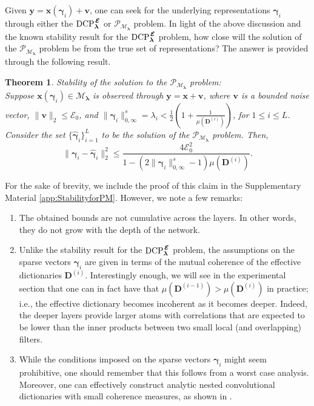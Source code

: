 \documentclass[10pt,journal]{IEEEtran}
\def\x{{\mathbf x}}
\def\v{{\mathbf v}}
\def\y{{\mathbf y}}
\def\D{{\mathbf D}}
\def\M{{\mathcal{M}}}
\def\P{{\mathcal{P}}}
\def\gama{{\boldsymbol \gamma}}
\def\lamda{{\boldsymbol \lambda}}
\def\vps{{\bm{\mathbf{\mathcal{E}}}}}
\def\DCPE{{\text{DCP}_\lamda^{\hspace{0.04cm} \vps}}}
\def\PM{{\P_{\M_\lamda}}}
\theoremstyle{plain}
\newtheorem{thm}{Theorem} %
\theoremstyle{definition}
\begin{document}
Given $\y = \x(\gama_i) + \v$, one can seek for the underlying representations $\gama_i$ through either the $\DCPE$ or $\PM$ problem. In light of the above discussion and the known stability result for the $\DCPE$ problem, how close will the solution of the $\PM$ problem be from the true set of representations? The answer is provided through the following result.



\begin{thm}{ Stability of the solution to the $\PM$ problem:} \label{Thm:GlobalStability} \\
	Suppose $\x(\gama_i) \in \M_\lamda$ is observed through $\y = \x+ \v$, where $\v$ is a bounded noise vector, $\|\v\|_2 \leq \mathcal{E}_0$, and %
	$\|\gama_i\|^s_{0,\infty} = \lambda_i < \frac{1}{2}\left(1+\frac{1}{\mu(\D^{(i)})}\right)$, for $1\leq i \leq L$. Consider the set $\{\hat{\gama}_i\}_{i=1}^{L}$ to be the solution of the $\PM$ problem. Then,
	\begin{equation} \label{Eq:DCPEStability}
	\| \gama_i- \hat{\gama}_i \|_2^2 \leq \frac{4\mathcal{E}_{0}^2}{1-(2\|\gama_{i}\|^s_{0,\infty}-1)\mu(\D^{(i)})}.
	\end{equation}
\end{thm}
For the sake of brevity, we include the proof of this claim in the Supplementary Material \ref{app:StabilityforPM}. However, we note a few remarks:
\begin{enumerate}

	\item The obtained bounds are not cumulative across the layers. In other words, they do not grow with the depth of the network.
 
	\item Unlike the stability result for the $\DCPE$ problem, the assumptions on the sparse vectors $\gama_i$ are given in terms of the mutual coherence of the effective dictionaries $\D^{(i)}$. Interestingly enough, we will see in the experimental section that one can in fact have that $\mu(\D^{(i-1)}) > \mu(\D^{(i)})$ in practice; i.e., the effective dictionary becomes incoherent as it becomes deeper. Indeed, the deeper layers provide larger atoms with correlations that are expected to be lower than the inner products between two small local (and overlapping) filters.

	\item While the conditions imposed on the sparse vectors $\gama_i$ might seem prohibitive, one should remember that this follows from a worst case analysis. Moreover, one can effectively construct analytic nested convolutional dictionaries with small coherence measures, as shown in \cite{Papyan2016convolutional}.

\end{enumerate}
\end{document}
